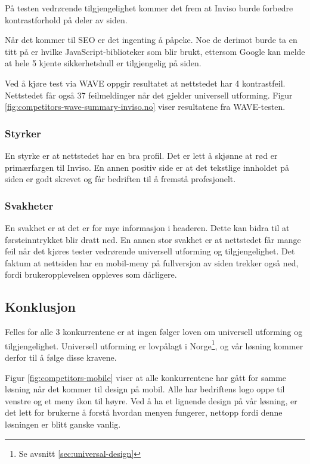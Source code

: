 På testen vedrørende tilgjengelighet kommer det frem at Inviso burde forbedre kontrastforhold på deler av siden.

Når det kommer til SEO er det ingenting å påpeke. Noe de derimot burde ta en titt på er hvilke JavaScript-biblioteker som blir brukt, ettersom Google kan melde at hele 5 kjente sikkerhetshull er tilgjengelig på siden. 

Ved å kjøre test via WAVE oppgir resultatet at nettstedet har 4 kontrastfeil. Nettstedet får også 37 feilmeldinger når det gjelder universell utforming. Figur \ref{fig:competitors-wave-summary-inviso.no} viser resultatene fra WAVE-testen.

\subsubsection{Styrker} 
En styrke er at nettstedet har en bra profil. Det er lett å skjønne at rød er primærfargen til Inviso. En annen positiv side er at det tekstlige innholdet på siden er godt skrevet og får bedriften til å fremstå profesjonelt.

\subsubsection{Svakheter}
En svakhet er at det er for mye informasjon i headeren. Dette kan bidra til at førsteinntrykket blir dratt ned. En annen stor svakhet er at nettstedet får mange feil når det kjøres tester vedrørende universell utforming og tilgjengelighet. Det faktum at nettsiden har en mobil-meny på fullversjon av siden trekker også ned, fordi brukeropplevelsen oppleves som dårligere.

\subsection{Konklusjon}
\label{sec:analysis-competitors-conclusion}
Felles for alle 3 konkurrentene er at ingen følger loven om universell utforming og tilgjengelighet. Universell utforming er lovpålagt i Norge\footnote{Se avsnitt \ref{sec:universal-design}}, og vår løsning kommer derfor til å følge disse kravene. 

Figur \ref{fig:competitors-mobile} viser at alle konkurrentene har gått for samme løsning når det kommer til design på mobil. Alle har bedriftens logo oppe til venstre og et meny ikon til høyre. Ved å ha et lignende design på vår løsning, er det lett for brukerne å forstå hvordan menyen fungerer, nettopp fordi denne løsningen er blitt ganske vanlig.


